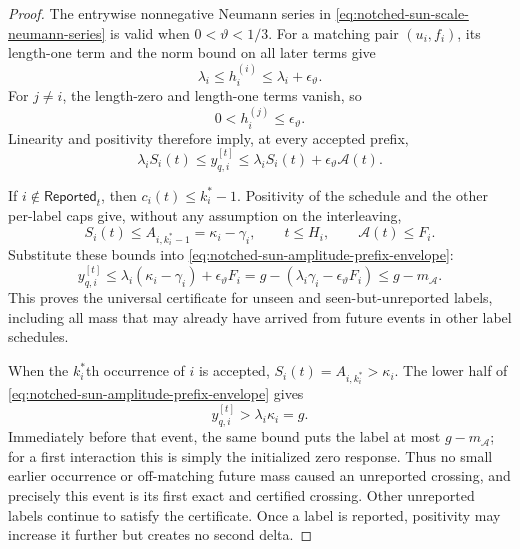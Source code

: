 \begin{proof}
The entrywise nonnegative Neumann series in
\cref{eq:notched-sun-scale-neumann-series} is valid when
$0<\vartheta<1/3$.  For a matching pair $(u_i,f_i)$, its length-one term and
the norm bound on all later terms give
\begin{equation}
 \lambda_i\leq h_i^{(i)}\leq\lambda_i+\epsilon_\vartheta.
 \label{eq:notched-sun-amplitude-pointwise-matching}
\end{equation}
For $j\ne i$, the length-zero and length-one terms vanish, so
\begin{equation}
 0<h_i^{(j)}\leq\epsilon_\vartheta.
 \label{eq:notched-sun-amplitude-pointwise-off}
\end{equation}
Linearity and positivity therefore imply, at every accepted prefix,
\begin{equation}
 \lambda_iS_i(t)
 \leq y_{q,i}^{[t]}
 \leq \lambda_iS_i(t)+\epsilon_\vartheta\mathcal A(t).
 \label{eq:notched-sun-amplitude-prefix-envelope}
\end{equation}

If $i\notin\mathsf{Reported}_t$, then $c_i(t)\leq k_i^*-1$.  Positivity of
the schedule and the other per-label caps give, without any assumption on
the interleaving,
\begin{equation*}
 S_i(t)\leq A_{i,k_i^*-1}=\kappa_i-\gamma_i,
 \qquad
 t\leq H_i,
 \qquad
 \mathcal A(t)\leq F_i.
\end{equation*}
Substitute these bounds into
\cref{eq:notched-sun-amplitude-prefix-envelope}:
\begin{equation*}
 y_{q,i}^{[t]}
 \leq\lambda_i(\kappa_i-\gamma_i)
      +\epsilon_\vartheta F_i
 =g-(\lambda_i\gamma_i-\epsilon_\vartheta F_i)
 \leq g-m_{\mathcal A}.
\end{equation*}
This proves the universal certificate for unseen and seen-but-unreported
labels, including all mass that may already have arrived from future events
in other label schedules.

When the $k_i^*$th occurrence of $i$ is accepted,
$S_i(t)=A_{i,k_i^*}>\kappa_i$.  The lower half of
\cref{eq:notched-sun-amplitude-prefix-envelope} gives
\begin{equation*}
 y_{q,i}^{[t]}>\lambda_i\kappa_i=g.
\end{equation*}
Immediately before that event, the same bound puts the label at most
$g-m_{\mathcal A}$; for a first interaction this is simply the initialized
zero response.  Thus no small earlier occurrence or
off-matching future mass caused an unreported crossing, and precisely this
event is its first exact and certified crossing.  Other unreported labels
continue to satisfy the certificate.  Once a label is reported, positivity
may increase it further but creates no second delta.


\end{proof}
